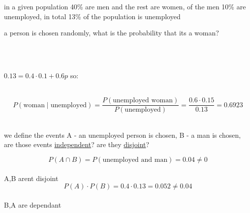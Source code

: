 \documentclass[a4paper,12pt]{article}
\newcommand{\?}{\stackrel{?}{=}}
\begin{document}
\begin{question}
in a given population 40\% are men and the rest are women, of the men 10\% are unemployed, in total 13\% of the population is unemployed\\[0pt]
\begin{subquestion}
a person is chosen randomly, what is the probability that its a woman?\\[0pt]
\begin{answer}
\begin{center}

\end{center}\\[0pt]

\begin{center}

\end{center}\\[0pt]

\(0.13 = 0.4 \cdot 0.1 + 0.6p\) so:\\[0pt]

\begin{center}

\end{center}\\[0pt]

\[
P(\text{woman} \mid \text{unemployed}) = \frac{P(\text{unemployed woman})}{P(\text{unemployed})} = \frac{0.6 \cdot 0.15}{0.13} = 0.6923
\]\\[0pt]
\end{answer}
\end{subquestion}
\begin{subquestion}
we define the events A - an unemployed person is chosen, B - a man is chosen, are those events \href{probability.org}{independent}? are they \href{probability.org}{disjoint}?\\[0pt]
\begin{answer}
\[P(A \cap B) = P(\text{unemployed and man}) = 0.04 \neq 0\]\\[0pt]
A,B arent disjoint\\[0pt]
\[P(A) \cdot P(B) = 0.4 \cdot 0.13 = 0.052 \neq 0.04\]\\[0pt]
B,A are dependant\\[0pt]
\end{answer}
\end{subquestion}
\end{question}
\end{document}
